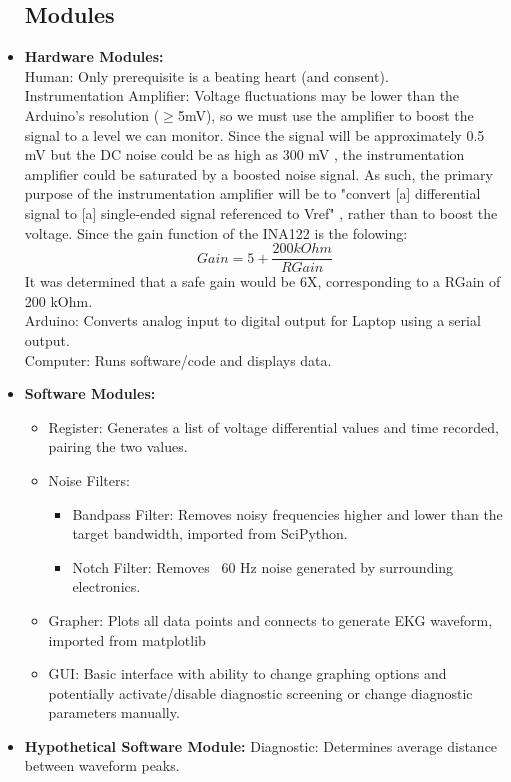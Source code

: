 \documentclass[11pt, oneside]{article}   	%
\begin{document}
\begin{itemize}[leftmargin=*]
\subsection{Modules}
\item[] \textbf{Hardware Modules:}\\
	Human: Only prerequisite is a beating heart (and consent).\\
	Instrumentation Amplifier: Voltage fluctuations may be lower than the Arduino's resolution ($\geq$5mV), so we must use the amplifier to boost the signal to a level we can monitor. Since the signal will be approximately 0.5 mV but the DC noise could be as high as 300 mV \cite{karptalk}, the instrumentation amplifier could be saturated by a boosted noise signal. As such, the primary purpose of the instrumentation amplifier will be to "convert [a] differential signal to [a] single-ended signal referenced to V{ref}" \cite{karptalk}, rather than to boost the voltage. Since the gain function of the INA122 is the folowing: 
	\begin{equation}
	Gain = 5 + \frac{200kOhm}{R{Gain}}
	\end{equation}
	It was determined that a safe gain would be 6X, corresponding to a R{Gain} of 200 kOhm.\\
	Arduino: Converts analog input to digital output for Laptop using a serial output.\\
	Computer: Runs software/code and displays data. 
	
\item[] \textbf{Software Modules:}
	\begin{itemize}
	\item Register: Generates a list of voltage differential values and time recorded, pairing the two values.
	\item Noise Filters:
		\begin{itemize}
		\item Bandpass Filter: Removes noisy frequencies higher and lower than the target bandwidth, imported from SciPython. \cite{SciPython}
		\item Notch Filter: Removes ~60 Hz noise generated by surrounding electronics.
		\end{itemize}  
	\item Grapher: Plots all data points and connects to generate EKG waveform, imported from matplotlib \cite{matplotlib}
	\item GUI: Basic interface with ability to change graphing options and potentially activate/disable diagnostic screening or change diagnostic parameters manually.
	\end{itemize}
\item[] \textbf{Hypothetical Software Module:}
	Diagnostic: Determines average distance between waveform peaks. 
\end{itemize}
\end{document}
